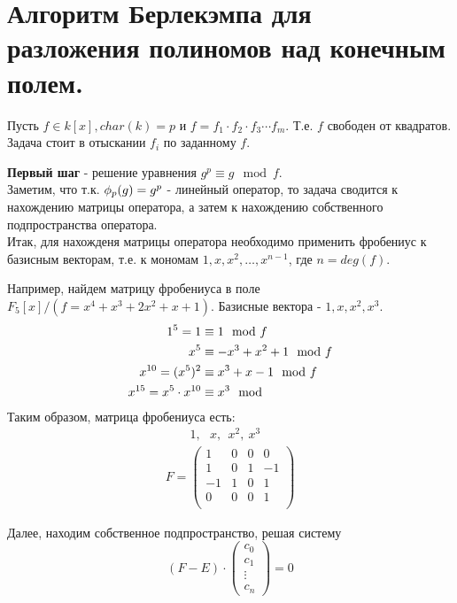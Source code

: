 \section{Алгоритм Берлекэмпа для разложения полиномов над конечным полем.}

Пусть $f \in k[x], char(k) = p$ и $f = f_1 \cdot f_2 \cdot f_3 \cdots f_m$. Т.е. $f$ свободен от квадратов. \\
Задача стоит в отыскании $f_i$ по заданному $f$.

\textbf{Первый шаг} - решение уравнения $g^p \equiv g \mod f$.\\
Заметим, что т.к. $\phi_{p}(g) = g^p$ - линейный оператор, то задача сводится к нахождению матрицы оператора, а затем к
нахождению собственного подпространства оператора. \\
Итак, для нахожденя матрицы оператора необходимо применить фробениус к базисным векторам, т.е. к мономам $1, x, x^2,
\dots, x^{n - 1}$, где $n = deg(f)$.

Например, найдем матрицу фробениуса в поле $F_5[x] / (f = x^4+x^3+2x^2+x+1)$. Базисные вектора - $1, x, x^2, x^3$.
\begin{align}
1^5 = 1 &\equiv 1 \mod f \notag \\
x^5 &\equiv -x^3 + x^2 + 1 \mod f \notag \\
x^{10} = (x^5)^2 &\equiv x^3 + x - 1 \mod f \notag \\
x^{15} = x^5 \cdot x^{10} &\equiv x^3 \mod \notag 
\end{align}
Таким образом, матрица фробениуса есть:
\[
\begin{array}{l}
~~~~~~~~~1,~~~x,~~x^2,~x^3 \\
F = 
\begin{pmatrix}
1 & 0 & 0 & 0 \\
1 & 0 & 1 & -1 \\
-1 & 1 & 0 & 1 \\
0 & 0 & 0 & 1 \\ 
\end{pmatrix}
\end{array}
\]

Далее, находим собственное подпространство, решая систему 
\[(F - E) \cdot \begin{pmatrix} c_0 \\ c_1\\ \vdots \\ c_n \end{pmatrix} = 0\]

